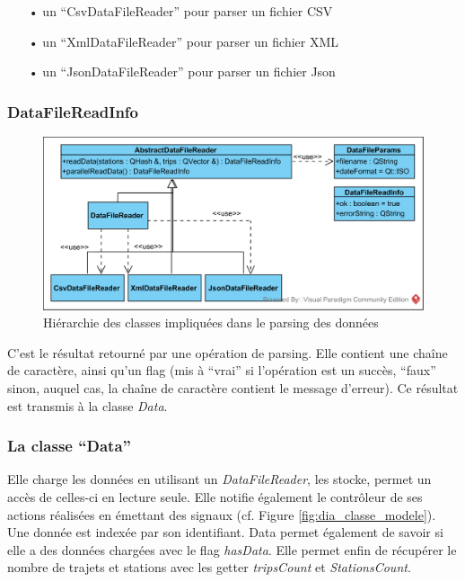 \documentclass[12pt]{article}
\begin{document}
		\begin{itemize}
			\item[•]un “CsvDataFileReader” pour parser un fichier CSV
			\item[•]un “XmlDataFileReader” pour parser un fichier XML
			\item[•]un “JsonDataFileReader” pour parser un fichier Json\\
		\end{itemize}
	
	
		\subsubsection{DataFileReadInfo}
		\begin{figure}[!h]
		\begin{center}
		\includegraphics[scale=1]{dia_class_parsing.png}
		\caption{Hiérarchie des classes impliquées dans le parsing des données}
		\end{center}
		\end{figure}
			
		C’est le résultat retourné par une opération de parsing. Elle contient une chaîne de caractère, ainsi qu’un flag (mis à “vrai” si l’opération est un succès, “faux” sinon, auquel cas, la chaîne de caractère contient le message d’erreur).
	Ce résultat est transmis à la classe \textit{Data}.
			
		\subsubsection{La classe “Data”}
	Elle charge les données en utilisant un \textit{DataFileReader}, les stocke, permet un accès de celles-ci en lecture seule. Elle notifie également le contrôleur de ses actions réalisées en émettant des signaux (cf. Figure \ref{fig:dia_classe_modele}). Une donnée est indexée par son identifiant. Data permet également de savoir si elle a des données chargées avec le flag \textit{hasData}. Elle permet enfin de récupérer le nombre de trajets et stations avec les getter \textit{tripsCount} et \textit{StationsCount}.
	
\end{document}
